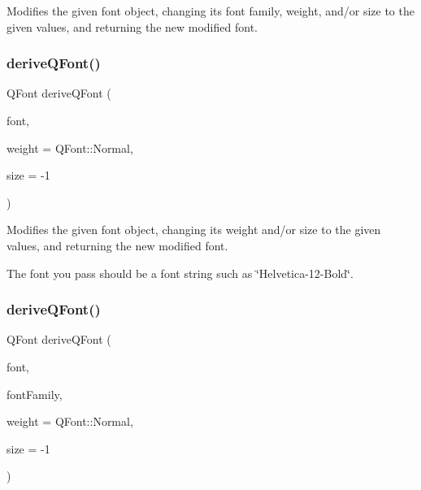 Modifies the given font object, changing its font family, weight, and/or size to the given values, and returning the new modified font. 

\mbox{\label{classGFont_a6fdde28adfdce9b43b7eb4d4a47ca23b}} 
\subsubsection{\texorpdfstring{derive\+Q\+Font()}{deriveQFont()}\hspace{0.1cm}{\footnotesize\ttfamily [3/4]}}
{\footnotesize\ttfamily Q\+Font derive\+Q\+Font (\begin{DoxyParamCaption}\item[{const std\+::string \&}]{font,  }\item[{Q\+Font\+::\+Weight}]{weight = {\ttfamily QFont\+:\+:Normal},  }\item[{int}]{size = {\ttfamily -\/1} }\end{DoxyParamCaption})\hspace{0.3cm}{\ttfamily [static]}}



Modifies the given font object, changing its weight and/or size to the given values, and returning the new modified font. 

The font you pass should be a font string such as \char`\"{}\+Helvetica-\/12-\/\+Bold\char`\"{}. \mbox{\label{classGFont_a50c41ebc7de0a4a038852b0764d3a6f2}} 
\subsubsection{\texorpdfstring{derive\+Q\+Font()}{deriveQFont()}\hspace{0.1cm}{\footnotesize\ttfamily [4/4]}}
{\footnotesize\ttfamily Q\+Font derive\+Q\+Font (\begin{DoxyParamCaption}\item[{const std\+::string \&}]{font,  }\item[{const std\+::string \&}]{font\+Family,  }\item[{Q\+Font\+::\+Weight}]{weight = {\ttfamily QFont\+:\+:Normal},  }\item[{int}]{size = {\ttfamily -\/1} }\end{DoxyParamCaption})\hspace{0.3cm}{\ttfamily [static]}}



